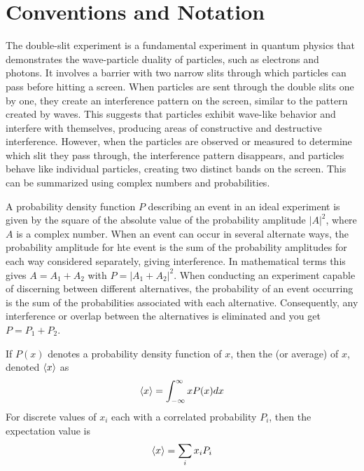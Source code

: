 \section{Conventions and Notation}

The double-slit experiment is a fundamental experiment in quantum physics that demonstrates the wave-particle duality of particles, such as electrons and photons. It involves a barrier with two narrow slits through which particles can pass before hitting a screen. When particles are sent through the double slits one by one, they create an interference pattern on the screen, similar to the pattern created by waves. This suggests that particles exhibit wave-like behavior and interfere with themselves, producing areas of constructive and destructive interference. However, when the particles are observed or measured to determine which slit they pass through, the interference pattern disappears, and particles behave like individual particles, creating two distinct bands on the screen. This can be summarized using complex numbers and probabilities.

A probability density function $P$ describing an event in an ideal experiment is given by the square of the absolute value of the probability amplitude $|A|^2$, where $A$ is a complex number. When an event can occur in several alternate ways, the probability amplitude for hte event is the sum of the probability amplitudes for each way considered separately, giving interference. In mathematical terms this gives $A=A_1+A_2$ with $P=|A_1+A_2|^2$. When conducting an experiment capable of discerning between different alternatives, the probability of an event occurring is the sum of the probabilities associated with each alternative. Consequently, any interference or overlap between the alternatives is eliminated and you get $P=P_1+P_2$.

\begin{defn}{1}
	If $P(x)$ denotes a probability density function of $x$, then the  (or average) of $x$, denoted $\braket{x}$ as
	\begin{align}
		\braket{x} = \int_{-\infty}^{\infty}xP(x) dx \label{expectation Value equation}
	\end{align}
	For discrete values of $x_i$ each with a correlated probability $P_i$, then the expectation value is 
	\begin{align}
		\braket{x} = \sum_{i}x_iP_i \label{expectation Value equation discrete}
	\end{align}
\end{defn}
 
